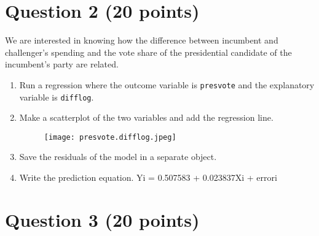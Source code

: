 \documentclass[12pt,letterpaper]{article}
\begin{document}
\section*{Question 2 (20 points)}
\noindent We are interested in knowing how the difference between incumbent and challenger's spending and the vote share of the presidential candidate of the incumbent's party are related.	\vspace{.25cm}
	\begin{enumerate}
		\item Run a regression where the outcome variable is \texttt{presvote} and the explanatory variable is \texttt{difflog}.	\vspace{1cm}
 		
\vspace{.5cm}		
		
		\item Make a scatterplot of the two variables and add the regression line. 	\vspace{1cm}
 	
\begin{figure} [H]
	\texttt{[image: presvote.difflog.jpeg]}
\end{figure}
\vspace{.5cm}			
		\item Save the residuals of the model in a separate object.	\vspace{1cm}
 		
\vspace{.5cm}	
		\item Write the prediction equation.
\noindent Yi = 0.507583 + 0.023837Xi + errori	
	\end{enumerate}
	
	\newpage	
\section*{Question 3 (20 points)}
\end{document}
